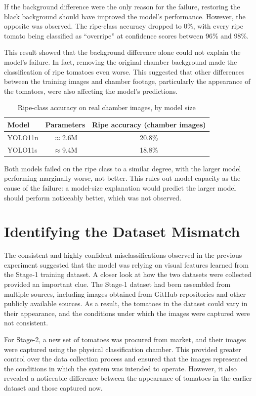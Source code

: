 \documentclass[12pt,a4paper]{report}
\begin{document}
If the background difference were the only reason for the failure, restoring the black background should have improved the model's performance. However, the opposite was observed. The ripe-class accuracy dropped to 0\%, with every ripe tomato being classified as ``overripe'' at confidence scores between 96\% and 98\%.

This result showed that the background difference alone could not explain the model's failure. In fact, removing the original chamber background made the classification of ripe tomatoes even worse. This suggested that other differences between the training images and chamber footage, particularly the appearance of the tomatoes, were also affecting the model's predictions.
\begin{table}[H]
\centering
\caption{Ripe-class accuracy on real chamber images, by model size}
\begin{tabular}{|l|c|c|}
\hline
\textbf{Model} & \textbf{Parameters} & \textbf{Ripe accuracy (chamber images)} \\
\hline
YOLO11n & $\approx$2.6M & 20.8\% \\
YOLO11s & $\approx$9.4M & 18.8\% \\
\hline
\end{tabular}
\end{table}

Both models failed on the ripe class to a similar degree, with the larger model performing marginally worse, not better. This rules out model capacity as the cause of the failure: a model-size explanation would predict the larger model should perform noticeably better, which was not observed.

\section{Identifying the Dataset Mismatch}

The consistent and highly confident misclassifications observed in the previous experiment suggested that the model was relying on visual features learned from the Stage-1 training dataset. A closer look at how the two datasets were collected provided an important clue. The Stage-1 dataset had been assembled from multiple sources, including images obtained from GitHub repositories and other publicly available sources. As a result, the tomatoes in the dataset could vary in their appearance, and the conditions under which the images were captured were not consistent.

For Stage-2, a new set of tomatoes was procured from market, and their images were captured using the physical classification chamber. This provided greater control over the data collection process and ensured that the images represented the conditions in which the system was intended to operate. However, it also revealed a noticeable difference between the appearance of tomatoes in the earlier dataset and those captured now.
\end{document}
